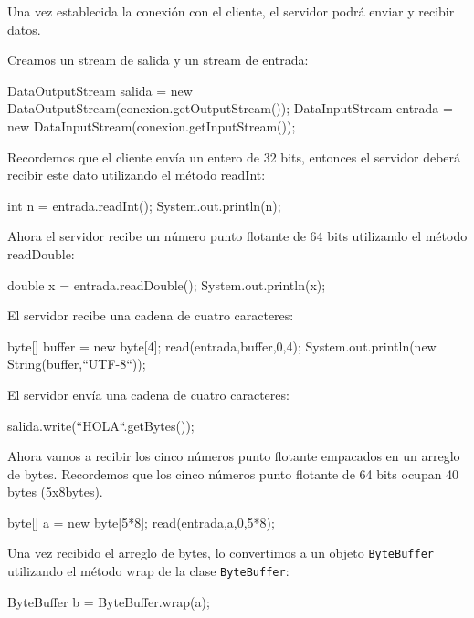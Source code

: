 Una vez establecida la conexión con el cliente, el servidor podrá enviar y recibir datos.

Creamos un stream de salida y un stream de entrada:

\begin{SourceCode}
DataOutputStream salida = new DataOutputStream(conexion.getOutputStream());
DataInputStream entrada = new DataInputStream(conexion.getInputStream());
\end{SourceCode}

Recordemos que el cliente envía un entero de 32 bits, entonces el servidor deberá recibir este dato utilizando el método readInt:

\begin{SourceCode}
int n = entrada.readInt();
System.out.println(n);
\end{SourceCode}

Ahora el servidor recibe un número punto flotante de 64 bits utilizando el método readDouble:

\begin{SourceCode}
double x = entrada.readDouble();
System.out.println(x);
\end{SourceCode}

El servidor recibe una cadena de cuatro caracteres:

\begin{SourceCode}
byte[] buffer = new byte[4];
read(entrada,buffer,0,4);
System.out.println(new String(buffer,``UTF-8``));
\end{SourceCode}

El servidor envía una cadena de cuatro caracteres:

\begin{SourceCode}
salida.write(``HOLA``.getBytes());
\end{SourceCode}

Ahora vamos a recibir los cinco números punto flotante empacados en un arreglo de bytes.
Recordemos que los cinco números punto flotante de 64 bits ocupan 40 bytes (5x8bytes).

\begin{SourceCode}
byte[] a = new byte[5*8];
read(entrada,a,0,5*8);
\end{SourceCode}

Una vez recibido el arreglo de bytes, lo convertimos a un objeto \texttt{ByteBuffer} utilizando el método wrap de la clase \texttt{ByteBuffer}:

\begin{SourceCode}
ByteBuffer b = ByteBuffer.wrap(a);
\end{SourceCode}


